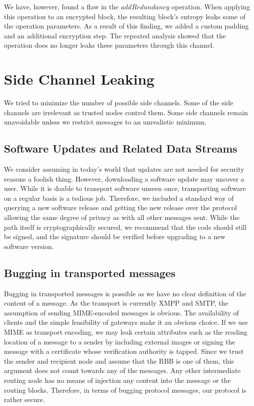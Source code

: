 We have, however, found a flaw in the $addRedundancy$ operation. When applying this operation to an encrypted block, the resulting block's entropy leaks some of the operation parameters. As a result of this finding, we added a custom padding and an additional encryption step. The repeated analysis showed that the operation does no longer leaks these parameters through this channel.

\section{Side Channel Leaking}
We tried to minimize the number of possible side channels. Some of the side channels are irrelevant as trusted nodes control them. Some side channels remain unavoidable unless we restrict messages to an unrealistic minimum. 

\subsection{Software Updates and Related Data Streams}
We consider assuming in today's world that updates are not needed for security reasons a foolish thing. However, downloading a software update may uncover a user. While it is doable to transport software unseen once, transporting software on a regular basis is a tedious job. Therefore, we included a standard way of querying a new software release and getting the new release over the \MessageVortex{} protocol allowing the same degree of privacy as with all other messages sent. While the path itself is cryptographically secured, we recommend that the code should still be signed, and the signature should be verified before upgrading to a new software version.

\subsection{Bugging in transported messages}
Bugging in transported messages is possible as we have no clear definition of the content of a message. As the transport is currently XMPP and SMTP, the assumption of sending MIME-encoded messages is obvious. The availability of clients and the simple feasibility of gateways make it an obvious choice. If we use MIME as transport encoding, we may leak certain attributes such as the reading location of a message to a sender by including external images or signing the message with a certificate whose verification authority is tapped. Since we trust the sender and recipient node and assume that the RBB is one of them, this argument does not count towards any of the messages. Any other intermediate routing node has no means of injection any content into the message or the routing blocks. Therefore, in terms of bugging protocol messages, our protocol is rather secure.

